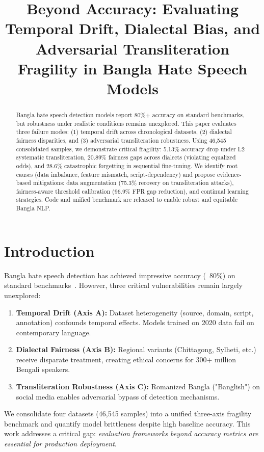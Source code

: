 \documentclass[conference]{IEEEtran}
\title{Beyond Accuracy: Evaluating Temporal Drift, Dialectal Bias, and Adversarial Transliteration Fragility in Bangla Hate Speech Models}
\author{\IEEEauthorblockN{\ }
\IEEEauthorblockA{\ }}
\begin{document}
\maketitle

\begin{abstract}
Bangla hate speech detection models report 80\%+ accuracy on standard benchmarks, but robustness under realistic conditions remains unexplored. This paper evaluates three failure modes: (1) temporal drift across chronological datasets, (2) dialectal fairness disparities, and (3) adversarial transliteration robustness. Using 46,545 consolidated samples, we demonstrate critical fragility: 5.13\% accuracy drop under L2 systematic transliteration, 20.89\% fairness gaps across dialects (violating equalized odds), and 28.6\% catastrophic forgetting in sequential fine-tuning. We identify root causes (data imbalance, feature mismatch, script-dependency) and propose evidence-based mitigations: data augmentation (75.3\% recovery on transliteration attacks), fairness-aware threshold calibration (96.9\% FPR gap reduction), and continual learning strategies. Code and unified benchmark are released to enable robust and equitable Bangla NLP.
\end{abstract}

\section{Introduction}

Bangla hate speech detection has achieved impressive accuracy (~80\%) on standard benchmarks~\cite{karim2020,bhattacharjee2022banglaber,jahan2022banglahatebert}. However, three critical vulnerabilities remain largely unexplored:

\begin{enumerate}
\item \textbf{Temporal Drift (Axis A):} Dataset heterogeneity (source, domain, script, annotation) confounds temporal effects. Models trained on 2020 data fail on contemporary language.
\item \textbf{Dialectal Fairness (Axis B):} Regional variants (Chittagong, Sylheti, etc.) receive disparate treatment, creating ethical concerns for 300+ million Bengali speakers.
\item \textbf{Transliteration Robustness (Axis C):} Romanized Bangla ("Banglish") on social media enables adversarial bypass of detection mechanisms.
\end{enumerate}

We consolidate four datasets (46,545 samples) into a unified three-axis fragility benchmark and quantify model brittleness despite high baseline accuracy. This work addresses a critical gap: \textit{evaluation frameworks beyond accuracy metrics are essential for production deployment}.
\end{document}
